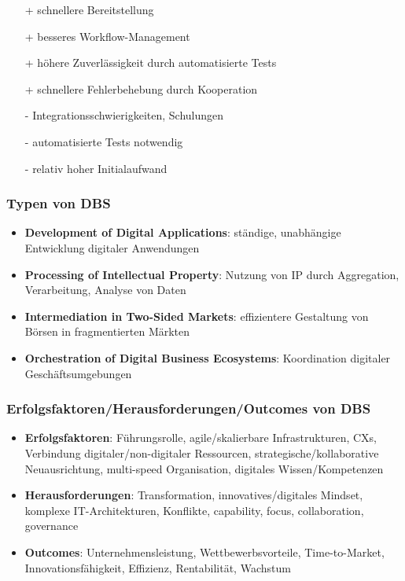 \documentclass{article}
\begin{document}
\begin{itemize}
  \item[+] schnellere Bereitstellung
  \item[+] besseres Workflow-Management
  \item[+] höhere Zuverlässigkeit durch automatisierte Tests
  \item[+] schnellere Fehlerbehebung durch Kooperation
  \item[-] Integrationsschwierigkeiten, Schulungen
  \item[-] automatisierte Tests notwendig
  \item[-] relativ hoher Initialaufwand
\end{itemize}

\subsubsection{Typen von DBS}

\begin{itemize}
  \item \textbf{Development of Digital Applications}: ständige, unabhängige Entwicklung digitaler Anwendungen
  \item \textbf{Processing of Intellectual Property}: Nutzung von IP durch Aggregation, Verarbeitung, Analyse von Daten
  \item \textbf{Intermediation in Two-Sided Markets}: effizientere Gestaltung von Börsen in fragmentierten Märkten
  \item \textbf{Orchestration of Digital Business Ecosystems}: Koordination digitaler Geschäftsumgebungen
\end{itemize}

\subsubsection{Erfolgsfaktoren/Herausforderungen/Outcomes von DBS}

\begin{itemize}
  \item \textbf{Erfolgsfaktoren}: Führungsrolle, agile/skalierbare Infrastrukturen, CXs, Verbindung digitaler/non-digitaler Ressourcen, strategische/kollaborative Neuausrichtung, multi-speed Organisation, digitales Wissen/Kompetenzen
  \item \textbf{Herausforderungen}: Transformation, innovatives/digitales Mindset, komplexe IT-Architekturen, Konflikte, capability, focus, collaboration, governance
  \item \textbf{Outcomes}: Unternehmensleistung, Wettbewerbsvorteile, Time-to-Market, Innovationsfähigkeit, Effizienz, Rentabilität, Wachstum
\end{itemize}
\end{document}
